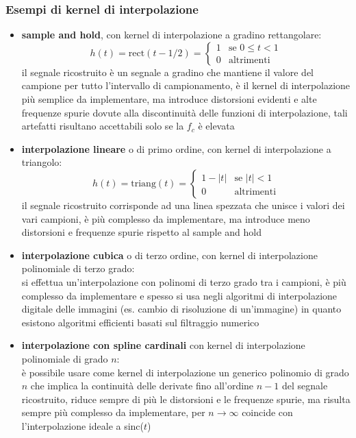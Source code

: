 \subsubsection*{Esempi di kernel di interpolazione}
\begin{itemize}
	\item \textbf{sample and hold}, con kernel di interpolazione a gradino rettangolare:
	\[h(t) = \text{rect}(t-1/2) = \begin{cases}
		1 & \text{se } 0 \leq t < 1 \\
		0 & \text{altrimenti}
	\end{cases}\]
	il segnale ricostruito è un segnale a gradino che mantiene il valore del campione per tutto l'intervallo di campionamento,
	è il kernel di interpolazione più semplice da implementare, ma introduce distorsioni evidenti e alte frequenze spurie
	dovute alla discontinuità delle funzioni di interpolazione, tali artefatti risultano accettabili solo se la \(f_c\) è elevata
	
	\item \textbf{interpolazione lineare} o di primo ordine, con kernel di interpolazione a triangolo:
	\[h(t) = \text{triang}(t) = \begin{cases}
		1 - |t| & \text{se } |t| < 1 \\
		0 & \text{altrimenti}
	\end{cases}\]
	il segnale ricostruito corrisponde ad una linea spezzata che unisce i valori dei vari campioni, è più complesso da
	implementare, ma introduce meno distorsioni e frequenze spurie rispetto al sample and hold
	
	\item \textbf{interpolazione cubica} o di terzo ordine, con kernel di interpolazione polinomiale di terzo grado: \\
	si effettua un'interpolazione con polinomi di terzo grado tra i campioni, è più complesso da implementare e spesso
	si usa negli algoritmi di interpolazione digitale delle immagini (es. cambio di risoluzione di un'immagine) in quanto
	esistono algoritmi efficienti basati sul filtraggio numerico

	\item \textbf{interpolazione con spline cardinali} con kernel di interpolazione polinomiale di grado \(n\): \\
	è possibile usare come kernel di interpolazione un generico polinomio di grado \(n\) che implica la continuità delle
	derivate fino all'ordine \(n-1\) del segnale ricostruito, riduce sempre di più le distorsioni e le frequenze spurie,
	ma risulta sempre più complesso da implementare, per \(n \to \infty\) coincide con l'interpolazione ideale a sinc(\(t\))
	

\end{itemize}
